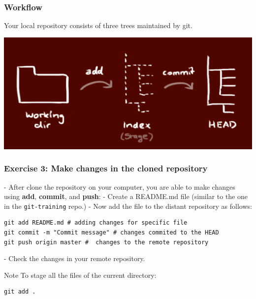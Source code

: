 \documentclass[svgnames]{beamer}
\begin{document}
\begin{frame}[fragile]
\frametitle{Workflow}

Your local repository consists of three trees maintained by git.

\vspace{1em}
\begin{center}
\includegraphics[scale=0.25]{img/workflow.png}
\end{center}
\end{frame}


\begin{frame}[fragile]
\frametitle{Exercise 3: Make changes in the cloned repository}

- After clone the repository on your computer, you are able to make changes using \textbf{add}, \textbf{commit}, and \textbf{push}:
- Create a README.md file (similar to the one in the \verb+git-training+ repo.)
- Now add the file to the distant repository as follows:

\begin{lstlisting}
git add README.md # adding changes for specific file
git commit -m "Commit message" # changes commited to the HEAD
git push origin master #  changes to the remote repository
\end{lstlisting}

- Check the changes in your remote repository.

    \begin{block}{Note}
        To stage all the files of the current directory:
\begin{lstlisting}
git add .
\end{lstlisting}
    \end{block}

\end{frame}
\end{document}

